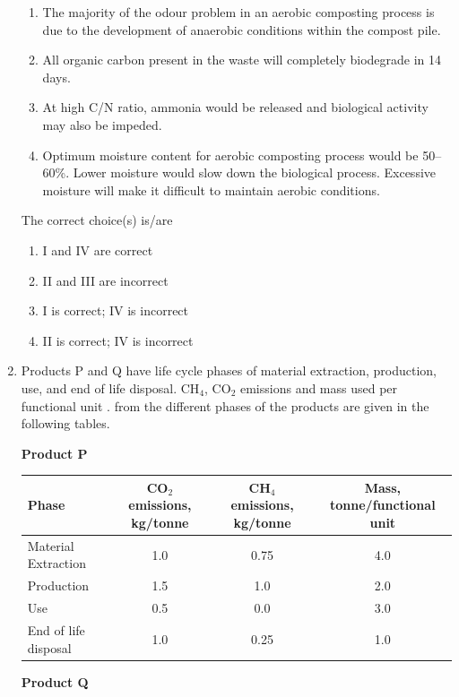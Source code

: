 \documentclass[journal,12pt,onecolumn]{IEEEtran}
\theoremstyle{remark}
\begin{document}
\begin{enumerate}
\begin{enumerate}[label=\Roman*.]
\item The majority of the odour problem in an aerobic composting process is due to the development of anaerobic conditions within the compost pile.
\item All organic carbon present in the waste will completely biodegrade in 14 days.
\item At high C/N ratio, ammonia would be released and biological activity may also be impeded.
\item Optimum moisture content for aerobic composting process would be 50--60\%. Lower moisture would slow down the biological process. Excessive moisture will make it difficult to maintain aerobic conditions.
\end{enumerate}

The correct choice(s) is/are

\begin{enumerate}
\item I and IV are correct
\item II and III are incorrect
\item I is correct; IV is incorrect
\item II is correct; IV is incorrect
\end{enumerate}
\hfill{}

\newpage

\item Products P and Q have life cycle phases of material extraction, production, use, and end of life disposal. CH$_4$, CO$_2$ emissions and mass used per functional unit . from the different phases of the products are given in the following tables.

\textbf{Product P}

\begin{tabular}{|l|c|c|c|}
\hline
Phase & CO$_2$ emissions, kg/tonne & CH$_4$ emissions, kg/tonne & Mass, tonne/functional unit  \\
\hline
Material Extraction & 1.0 & 0.75 & 4.0 \\
Production & 1.5 & 1.0 & 2.0 \\
Use & 0.5 & 0.0 & 3.0 \\
End of life disposal & 1.0 & 0.25 & 1.0 \\
\hline
\end{tabular}

\vspace{0.3cm}
\textbf{Product Q}


\end{enumerate}
\end{document}
